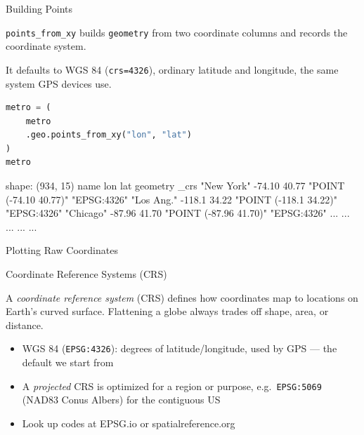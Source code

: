 \documentclass[8pt,aspectratio=169]{beamer}
\begin{document}
\begin{frame}[fragile]{Building Points}
\begin{splitcode}{%

\texttt{points\_from\_xy} builds \texttt{geometry} from two coordinate columns and records the coordinate system.

It defaults to WGS 84 (\texttt{crs=4326}), ordinary latitude and longitude, the same system GPS devices use.

}
\begin{lstlisting}[language=Python]
metro = (
    metro
    .geo.points_from_xy("lon", "lat")
)
metro
\end{lstlisting}
\begin{codeoutput}
shape: (934, 15)
name        lon     lat    geometry                _crs
"New York"  -74.10  40.77  "POINT (-74.10 40.77)"  "EPSG:4326"
"Los Ang."  -118.1  34.22  "POINT (-118.1 34.22)"  "EPSG:4326"
"Chicago"   -87.96  41.70  "POINT (-87.96 41.70)"  "EPSG:4326"
...         ...     ...    ...                     ...
\end{codeoutput}
\end{splitcode}
\end{frame}

\begin{rightframe}{Plotting Raw Coordinates}
\end{rightframe}

\begin{textframe}{Coordinate Reference Systems (CRS)}

A \textit{coordinate reference system} (CRS) defines how coordinates map to locations on Earth's curved surface. Flattening a globe always trades off shape, area, or distance.

\begin{itemize}
\item WGS 84 (\texttt{EPSG:4326}): degrees of latitude/longitude, used by GPS --- the default we start from
\item A \textit{projected} CRS is optimized for a region or purpose, e.g.\ \texttt{EPSG:5069} (NAD83 Conus Albers) for the contiguous US
\item Look up codes at EPSG.io or spatialreference.org
\end{itemize}

\end{textframe}
\end{document}
